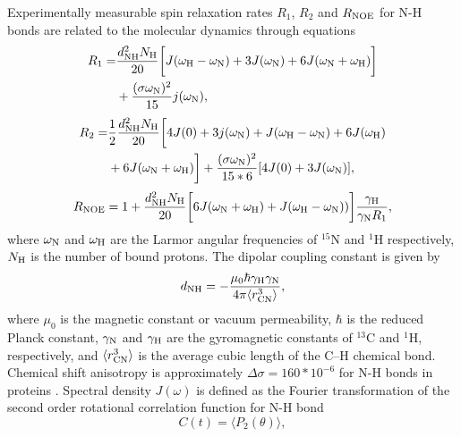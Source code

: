 \documentclass[pre,aps,floatfix,authordate1-4,twocolumn]{revtex4-1}
\begin{document}
Experimentally measurable spin relaxation rates $R_1$, $R_2$ and $R_{\rm NOE}$ for N-H bonds
are related to the molecular dynamics through equations \cite{abragam,kay89}
\begin{equation}\label{R1}
  \begin{aligned}
  R_{1}= & \frac{d_{\rm{NH}}^2N_{\rm{H}}}{20}\bigg[J(\omega_{\rm{H}}-\omega_{\rm{N}})+3J(\omega_{\rm{N}})+6J(\omega_{\rm{N}}+\omega_{\rm{H}})\bigg] \\
        & +\frac{(\sigma \omega_{\rm{N}})^2}{15}j(\omega_{\rm{N}}),
  \end{aligned}
\end{equation}
\begin{equation}\label{R2}
    \begin{aligned}
  R_{2}= & \frac{1}{2}\frac{d_{\rm{NH}}^2N_{\rm{H}}}{20}\bigg[4J(0)+3j(\omega_{\rm{N}})+J(\omega_{\rm{H}}-\omega_{\rm{N}})+6J(\omega_{\rm{H}})  \\
    & +6J(\omega_{\rm{N}}+\omega_{\rm{H}})\bigg]+\frac{(\sigma \omega_{\rm{N}})^2}{15*6}[4J(0) +3J(\omega_{\rm{N}})],
    \end{aligned}
\end{equation}
\begin{equation}\label{NOE}
R_{\rm NOE}=1+\frac{d_{\rm{NH}}^2N_{\rm{H}}}{20}\bigg[6J(\omega_{\rm{N}}+\omega_{\rm{H}})+J(\omega_{\rm{H}}-\omega_{\rm{N}}))\bigg]\frac{\gamma_{\rm{H}}}{\gamma_{\rm{N}}R_1},
\end{equation}
where $\omega_{\rm{N}}$ and $\omega_{\rm{H}}$ are the Larmor angular frequencies of $^{15}$N and $^1$H respectively,
$N_{\rm{H}}$ is the number of bound protons. The dipolar coupling constant is given by
\begin{equation}
d_{\rm{NH}}=-\frac{\mu_0\hbar\gamma_{\rm{H}}\gamma_{\rm{N}}}{4\pi\langle r_{\rm{CN}}^3\rangle},\nonumber
\end{equation}
where $\mu_0$ is the magnetic constant or vacuum permeability, $\hbar$ is the reduced Planck constant,
$\gamma_{\rm{N}}$ and $\gamma_{\rm{H}}$ are the gyromagnetic constants of $^{13}$C and $^1$H, respectively,
and $\langle r_{\rm{CN}}^3\rangle$ is the average cubic length of the C--H chemical bond.
Chemical shift anisotropy is approximately $\Delta \sigma=160*10^{-6}$ for N-H bonds in proteins \cite{??}.
Spectral density $J(\omega)$ is defined as the Fourier transformation of the second order
rotational correlation function for N-H bond
\begin{equation}
  C(t)=\langle P_2(\theta) \rangle,
\end{equation}
\end{document}
